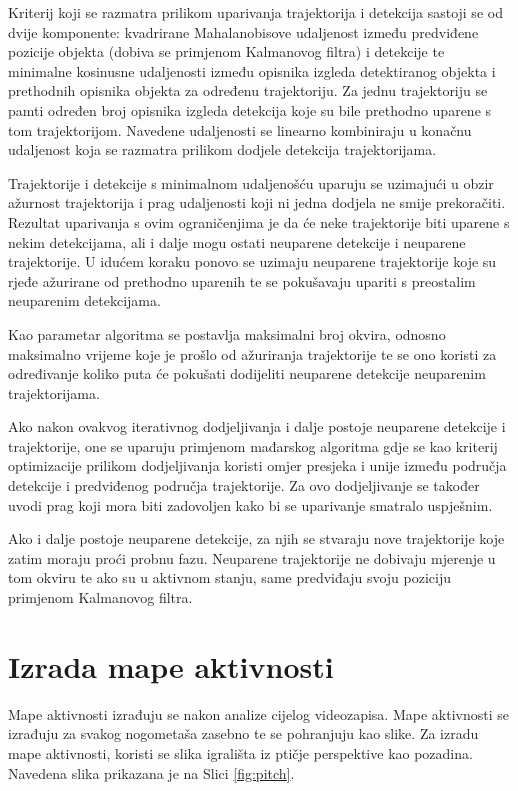\documentclass[times, utf8, seminar, numeric]{fer}
\begin{document}
Kriterij koji se razmatra prilikom uparivanja trajektorija i detekcija sastoji se od dvije komponente: kvadrirane Mahalanobisove udaljenost između predviđene pozicije objekta (dobiva se primjenom Kalmanovog filtra) i detekcije te minimalne kosinusne udaljenosti između opisnika izgleda detektiranog objekta i prethodnih opisnika objekta za određenu trajektoriju. Za jednu trajektoriju se pamti određen broj opisnika izgleda detekcija koje su bile prethodno uparene s tom trajektorijom. Navedene udaljenosti se linearno kombiniraju u konačnu udaljenost koja se razmatra prilikom dodjele detekcija trajektorijama.

Trajektorije i detekcije s minimalnom udaljenošću uparuju se uzimajući u obzir ažurnost trajektorija i prag udaljenosti koji ni jedna dodjela ne smije prekoračiti. Rezultat uparivanja s ovim ograničenjima je da će neke trajektorije biti uparene s nekim detekcijama, ali i dalje mogu ostati neuparene detekcije i neuparene trajektorije. U idućem koraku ponovo se uzimaju  neuparene trajektorije koje su rjeđe ažurirane od prethodno uparenih te se pokušavaju upariti s preostalim neuparenim detekcijama. 

Kao parametar algoritma se postavlja maksimalni broj okvira, odnosno maksimalno vrijeme koje je prošlo od ažuriranja trajektorije te se ono koristi za određivanje koliko puta će pokušati dodijeliti neuparene detekcije neuparenim trajektorijama. 

Ako nakon ovakvog iterativnog dodjeljivanja i dalje postoje neuparene detekcije i trajektorije, one se uparuju primjenom mađarskog algoritma gdje se kao kriterij optimizacije prilikom dodjeljivanja koristi omjer presjeka i unije između područja detekcije i predviđenog područja trajektorije. Za ovo dodjeljivanje se također uvodi prag koji mora biti zadovoljen kako bi se uparivanje smatralo uspješnim\cite{deepsort}.

Ako i dalje postoje neuparene detekcije, za njih se stvaraju nove trajektorije koje zatim moraju proći probnu fazu. Neuparene trajektorije ne dobivaju mjerenje u tom okviru te ako su u aktivnom stanju, same predviđaju svoju poziciju primjenom Kalmanovog filtra.


\section{Izrada mape aktivnosti}

Mape aktivnosti izrađuju se nakon analize cijelog videozapisa. Mape aktivnosti se izrađuju za svakog nogometaša zasebno te se pohranjuju kao slike. 
Za izradu mape aktivnosti, koristi se slika igrališta iz ptičje perspektive kao pozadina. Navedena slika prikazana je na Slici \ref{fig:pitch}. 
\end{document}
